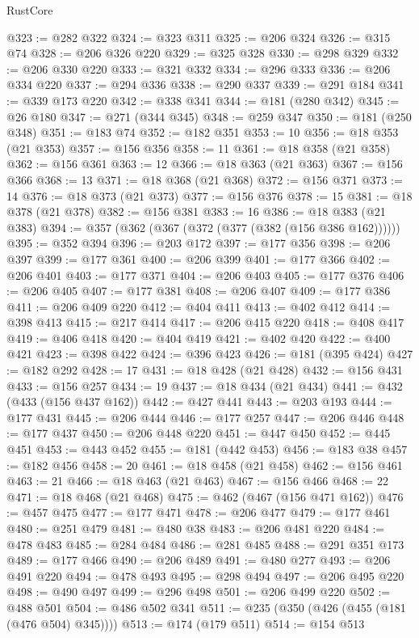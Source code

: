 \begin{lexlean}{RustCore}
\begin{coremodule}
@323 := @282 @322
@324 := @323 @311
@325 := @206 @324
@326 := @315 @74
@328 := @206 @326 @220
@329 := @325 @328
@330 := @298 @329
@332 := @206 @330 @220
@333 := @321 @332
@334 := @296 @333
@336 := @206 @334 @220
@337 := @294 @336
@338 := @290 @337
@339 := @291 @184
@341 := @339 @173 @220
@342 := @338 @341
@344 := @181 (@280 @342)
@345 := @26 @180
@347 := @271 (@344 @345)
@348 := @259 @347
@350 := @181 (@250 @348)
@351 := @183 @74
@352 := @182 @351
@353 := 10
@356 := @18 @353 (@21 @353)
@357 := @156 @356
@358 := 11
@361 := @18 @358 (@21 @358)
@362 := @156 @361
@363 := 12
@366 := @18 @363 (@21 @363)
@367 := @156 @366
@368 := 13
@371 := @18 @368 (@21 @368)
@372 := @156 @371
@373 := 14
@376 := @18 @373 (@21 @373)
@377 := @156 @376
@378 := 15
@381 := @18 @378 (@21 @378)
@382 := @156 @381
@383 := 16
@386 := @18 @383 (@21 @383)
@394 := @357 (@362 (@367 (@372 (@377 (@382 (@156 @386 @162))))))
@395 := @352 @394
@396 := @203 @172
@397 := @177 @356
@398 := @206 @397
@399 := @177 @361
@400 := @206 @399
@401 := @177 @366
@402 := @206 @401
@403 := @177 @371
@404 := @206 @403
@405 := @177 @376
@406 := @206 @405
@407 := @177 @381
@408 := @206 @407
@409 := @177 @386
@411 := @206 @409 @220
@412 := @404 @411
@413 := @402 @412
@414 := @398 @413
@415 := @217 @414
@417 := @206 @415 @220
@418 := @408 @417
@419 := @406 @418
@420 := @404 @419
@421 := @402 @420
@422 := @400 @421
@423 := @398 @422
@424 := @396 @423
@426 := @181 (@395 @424)
@427 := @182 @292
@428 := 17
@431 := @18 @428 (@21 @428)
@432 := @156 @431
@433 := @156 @257
@434 := 19
@437 := @18 @434 (@21 @434)
@441 := @432 (@433 (@156 @437 @162))
@442 := @427 @441
@443 := @203 @193
@444 := @177 @431
@445 := @206 @444
@446 := @177 @257
@447 := @206 @446
@448 := @177 @437
@450 := @206 @448 @220
@451 := @447 @450
@452 := @445 @451
@453 := @443 @452
@455 := @181 (@442 @453)
@456 := @183 @38
@457 := @182 @456
@458 := 20
@461 := @18 @458 (@21 @458)
@462 := @156 @461
@463 := 21
@466 := @18 @463 (@21 @463)
@467 := @156 @466
@468 := 22
@471 := @18 @468 (@21 @468)
@475 := @462 (@467 (@156 @471 @162))
@476 := @457 @475
@477 := @177 @471
@478 := @206 @477
@479 := @177 @461
@480 := @251 @479
@481 := @480 @38
@483 := @206 @481 @220
@484 := @478 @483
@485 := @284 @484
@486 := @281 @485
@488 := @291 @351 @173
@489 := @177 @466
@490 := @206 @489
@491 := @480 @277
@493 := @206 @491 @220
@494 := @478 @493
@495 := @298 @494
@497 := @206 @495 @220
@498 := @490 @497
@499 := @296 @498
@501 := @206 @499 @220
@502 := @488 @501
@504 := @486 @502 @341
@511 := @235 (@350 (@426 (@455 (@181 (@476 @504) @345))))
@513 := @174 (@179 @511)
@514 := @154 @513

\end{coremodule}
\end{lexlean}
